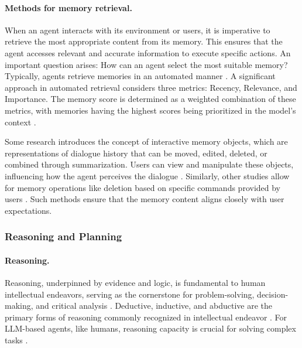 \paragraph{Methods for memory retrieval.}
When an agent interacts with its environment or users, it is imperative to retrieve the most appropriate content from its memory. This ensures that the agent accesses relevant and accurate information to execute specific actions. 
An important question arises: How can an agent select the most suitable memory? Typically, agents retrieve memories in an automated manner \cite{DBLP:journals/corr/abs-2305-10250, DBLP:journals/corr/abs-2308-04026}. A significant approach in automated retrieval considers three metrics: Recency, Relevance, and Importance. The memory score is determined as a weighted combination of these metrics, with memories having the highest scores being prioritized in the model's context \cite{DBLP:journals/corr/abs-2304-03442}. 

Some research introduces the concept of interactive memory objects, which are representations of dialogue history that can be moved, edited, deleted, or combined through summarization. Users can view and manipulate these objects, influencing how the agent perceives the dialogue \cite{DBLP:journals/corr/abs-2308-01542}. Similarly, other studies allow for memory operations like deletion based on specific commands provided by users \cite{DBLP:journals/corr/abs-2306-03901}. Such methods ensure that the memory content aligns closely with user expectations.


\subsubsection{Reasoning and Planning} \label{sec:reasoning and planning}
\paragraph{Reasoning.}

Reasoning, underpinned by evidence and logic, is fundamental to human intellectual endeavors, serving as the cornerstone for problem-solving, decision-making, and critical analysis \cite{wason1968reasoning, wason1972psychology, galotti1989approaches}. Deductive, inductive, and abductive are the primary forms of reasoning commonly recognized in intellectual endeavor \cite{DBLP:conf/acl/0009C23}. For LLM-based 
agents, like humans, reasoning capacity is crucial for solving complex tasks \cite{DBLP:journals/corr/abs-2303-08774}.

